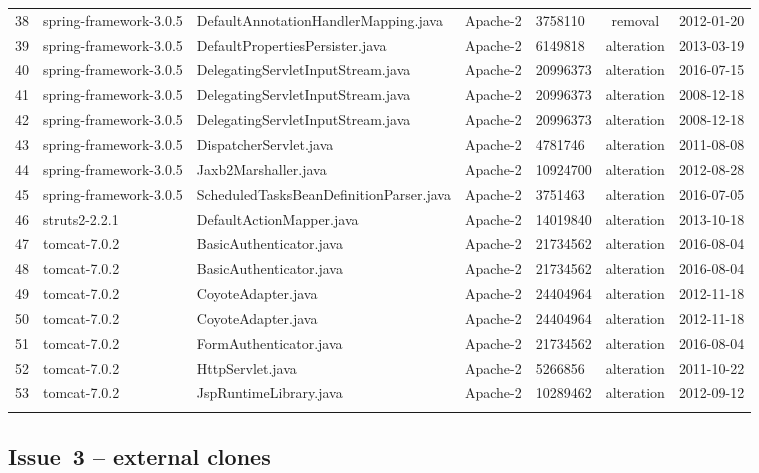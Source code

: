 \documentclass{sig-alternate-05-2015}
\begin{document}
\begin{table}
{\begin{tabular}{r|l|l|l|l|c|l}
		38 & spring-framework-3.0.5 & DefaultAnnotationHandlerMapping.java & Apache-2 & 3758110 & removal & 2012-01-20 \\
		39 & spring-framework-3.0.5 & DefaultPropertiesPersister.java & Apache-2 & 6149818 & alteration & 2013-03-19 \\
		40 & spring-framework-3.0.5 & DelegatingServletInputStream.java & Apache-2 & 20996373 & alteration & 2016-07-15 \\
		41 & spring-framework-3.0.5 & DelegatingServletInputStream.java & Apache-2 & 20996373 & alteration & 2008-12-18 \\
		42 & spring-framework-3.0.5 & DelegatingServletInputStream.java & Apache-2 & 20996373 & alteration & 2008-12-18 \\
		43 & spring-framework-3.0.5 & DispatcherServlet.java & Apache-2 & 4781746 & alteration & 2011-08-08 \\
		44 & spring-framework-3.0.5 & Jaxb2Marshaller.java & Apache-2 & 10924700 & alteration & 2012-08-28 \\
		45 & spring-framework-3.0.5 & ScheduledTasksBeanDefinitionParser.java & Apache-2 & 3751463 & alteration & 2016-07-05 \\
		46 & struts2-2.2.1 & DefaultActionMapper.java & Apache-2 & 14019840 & alteration & 2013-10-18 \\
		47 & tomcat-7.0.2 & BasicAuthenticator.java & Apache-2 & 21734562 & alteration & 2016-08-04 \\
		48 & tomcat-7.0.2 & BasicAuthenticator.java & Apache-2 & 21734562 & alteration & 2016-08-04 \\
		49 & tomcat-7.0.2 & CoyoteAdapter.java & Apache-2 & 24404964 & alteration & 2012-11-18 \\
		50 & tomcat-7.0.2 & CoyoteAdapter.java & Apache-2 & 24404964 & alteration & 2012-11-18 \\
		51 & tomcat-7.0.2 & FormAuthenticator.java & Apache-2 & 21734562 & alteration & 2016-08-04 \\
		52 & tomcat-7.0.2 & HttpServlet.java & Apache-2 & 5266856 & alteration & 2011-10-22 \\
		53 & tomcat-7.0.2 & JspRuntimeLibrary.java & Apache-2 & 10289462 & alteration & 2012-09-12 \\
		\hline& 
	\end{tabular} %
}
\end{table}

\subsection{Issue~3 -- external clones}
\end{document}
